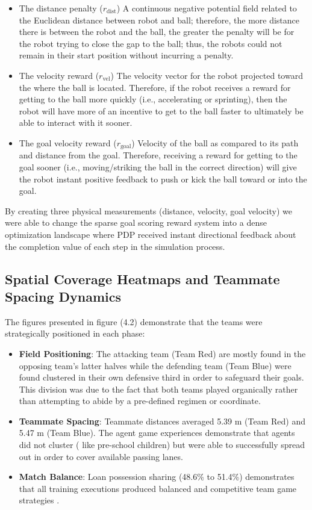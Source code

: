 \begin{itemize}
    \item The distance penalty ($r_{\text{dist}}$) A continuous negative potential field related to the Euclidean distance between robot and ball; therefore, the more distance there is between the robot and the ball, the greater the penalty will be for the robot trying to close the gap to the ball; thus, the robots could not remain in their start position without incurring a penalty.
    \item The velocity reward ($r_{\text{vel}}$) The velocity vector for the robot projected toward the where the ball is located. Therefore, if the robot receives a reward for getting to the ball more quickly (i.e., accelerating or sprinting), then the robot will have more of an incentive to get to the ball faster to ultimately be able to interact with it sooner.
    \item The goal velocity reward ($r_{\text{goal}}$) Velocity of the ball as compared to its path and distance from the goal. Therefore, receiving a reward for getting to the goal sooner (i.e., moving/striking the ball in the correct direction) will give the robot instant positive feedback to push or kick the ball toward or into the goal.
\end{itemize}
By creating three physical measurements (distance, velocity, goal velocity) we were able to change the sparse goal scoring reward system into a dense optimization landscape where PDP received instant directional feedback about the completion value of each step in the simulation process.

\subsection{Spatial Coverage Heatmaps and Teammate Spacing Dynamics}
\label{subsec:disc_spatial_analytics}

The figures presented in figure (4.2) demonstrate that the teams were strategically positioned in each phase:
\begin{itemize}
    \item \textbf{Field Positioning}: The attacking team (Team Red) are mostly found in the opposing team’s latter halves while the defending team (Team Blue) were found clustered in their own defensive third in order to safeguard their goals. This division was due to the fact that both teams played organically rather than attempting to abide by a pre-defined regimen or coordinate.
    \item \textbf{Teammate Spacing}: Teammate distances averaged 5.39 m (Team Red) and 5.47 m (Team Blue). The agent game experiences demonstrate that agents did not cluster ( like pre-school children) but were able to successfully spread out in order to cover available passing lanes.
    \item \textbf{Match Balance}: Loan possession sharing (48.6\% to 51.4\%) demonstrates that all training executions produced balanced and competitive team game strategies .
\end{itemize}

